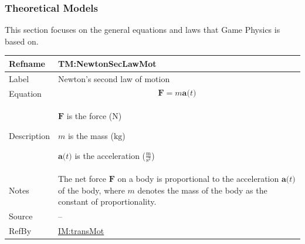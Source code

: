 \documentclass[12pt]{article}
\begin{document}
\subsubsection{Theoretical Models}
\label{Sec:TMs}
This section focuses on the general equations and laws that Game Physics is based on.

\vspace{\baselineskip}
\noindent
\begin{minipage}{\textwidth}
\begin{tabular}{>{\raggedright}p{}>{\raggedright\arraybackslash}p{}}
\toprule \textbf{Refname} & \textbf{TM:NewtonSecLawMot}
\label{TM:NewtonSecLawMot}
\\ \midrule
Label & Newton's second law of motion
        
\\ \midrule
Equation & \begin{displaymath}
           \symbf{F}=m \symbf{a}\text{(}t\text{)}
           \end{displaymath}
\\ \midrule
Description & \begin{symbDescription}
              \item{$\symbf{F}$ is the force (${\text{N}}$)}
              \item{$m$ is the mass (${\text{kg}}$)}
              \item{$\symbf{a}\text{(}t\text{)}$ is the acceleration ($\frac{\text{m}}{\text{s}^{2}}$)}
              \end{symbDescription}
\\ \midrule
Notes & The net force $\symbf{F}$ on a body is proportional to the acceleration $\symbf{a}\text{(}t\text{)}$ of the body, where $m$ denotes the mass of the body as the constant of proportionality.
        
\\ \midrule
Source & --
         
\\ \midrule
RefBy & \hyperref[IM:transMot]{IM:transMot}
        
\\ \bottomrule
\end{tabular}
\end{minipage}
\vspace{\baselineskip}
\noindent
\end{document}
